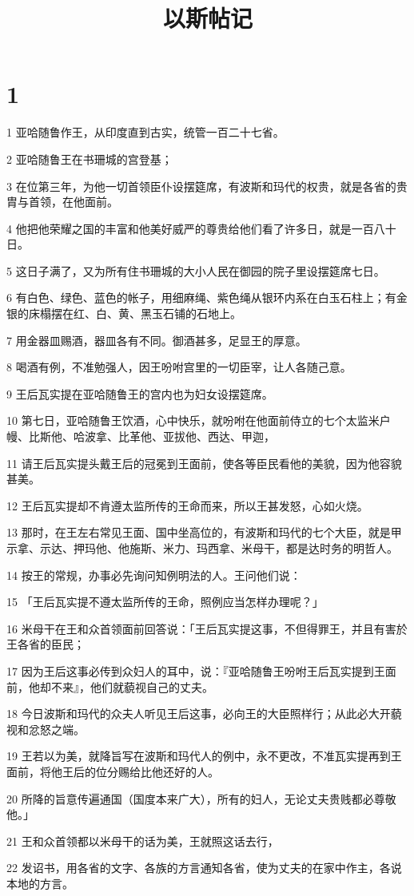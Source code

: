 

\title{以斯帖记}


\chapter{1}

\par 1 亚哈随鲁作王，从印度直到古实，统管一百二十七省。
\par 2 亚哈随鲁王在书珊城的宫登基；
\par 3 在位第三年，为他一切首领臣仆设摆筵席，有波斯和玛代的权贵，就是各省的贵胄与首领，在他面前。
\par 4 他把他荣耀之国的丰富和他美好威严的尊贵给他们看了许多日，就是一百八十日。
\par 5 这日子满了，又为所有住书珊城的大小人民在御园的院子里设摆筵席七日。
\par 6 有白色、绿色、蓝色的帐子，用细麻绳、紫色绳从银环内系在白玉石柱上；有金银的床榻摆在红、白、黄、黑玉石铺的石地上。
\par 7 用金器皿赐酒，器皿各有不同。御酒甚多，足显王的厚意。
\par 8 喝酒有例，不准勉强人，因王吩咐宫里的一切臣宰，让人各随己意。
\par 9 王后瓦实提在亚哈随鲁王的宫内也为妇女设摆筵席。
\par 10 第七日，亚哈随鲁王饮酒，心中快乐，就吩咐在他面前侍立的七个太监米户幔、比斯他、哈波拿、比革他、亚拔他、西达、甲迦，
\par 11 请王后瓦实提头戴王后的冠冕到王面前，使各等臣民看他的美貌，因为他容貌甚美。
\par 12 王后瓦实提却不肯遵太监所传的王命而来，所以王甚发怒，心如火烧。
\par 13 那时，在王左右常见王面、国中坐高位的，有波斯和玛代的七个大臣，就是甲示拿、示达、押玛他、他施斯、米力、玛西拿、米母干，都是达时务的明哲人。
\par 14 按王的常规，办事必先询问知例明法的人。王问他们说：
\par 15 「王后瓦实提不遵太监所传的王命，照例应当怎样办理呢？」
\par 16 米母干在王和众首领面前回答说：「王后瓦实提这事，不但得罪王，并且有害於王各省的臣民；
\par 17 因为王后这事必传到众妇人的耳中，说：『亚哈随鲁王吩咐王后瓦实提到王面前，他却不来』，他们就藐视自己的丈夫。
\par 18 今日波斯和玛代的众夫人听见王后这事，必向王的大臣照样行；从此必大开藐视和忿怒之端。
\par 19 王若以为美，就降旨写在波斯和玛代人的例中，永不更改，不准瓦实提再到王面前，将他王后的位分赐给比他还好的人。
\par 20 所降的旨意传遍通国（国度本来广大），所有的妇人，无论丈夫贵贱都必尊敬他。」
\par 21 王和众首领都以米母干的话为美，王就照这话去行，
\par 22 发诏书，用各省的文字、各族的方言通知各省，使为丈夫的在家中作主，各说本地的方言。

